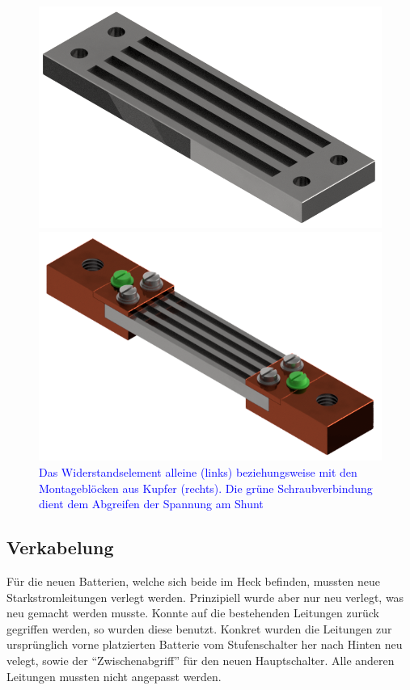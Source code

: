 \begin{figure}[h!]
\begin{minipage}{0.49\textwidth}
\includegraphics[width=\textwidth]{images/Shunt.png}
\end{minipage}\begin{minipage}{0.49\textwidth}
\includegraphics[width=\textwidth]{images/Shunt_komplett.png}
\end{minipage}
\caption{\textcolor{blue}{Das Widerstandselement alleine (links) beziehungsweise mit den Montageblöcken aus Kupfer (rechts). Die grüne Schraubverbindung dient dem Abgreifen der Spannung am Shunt}}%
\label{fig:shunt}%
\end{figure}

\subsection{Verkabelung}
Für die neuen Batterien, welche sich beide im Heck befinden, mussten neue Starkstromleitungen verlegt werden. Prinzipiell wurde aber nur neu verlegt, was neu gemacht werden musste. Konnte auf die bestehenden Leitungen zurück gegriffen werden, so wurden diese benutzt. Konkret wurden die Leitungen zur ursprünglich vorne platzierten Batterie vom Stufenschalter her nach Hinten neu velegt, sowie der "`Zwischenabgriff"' für den neuen Hauptschalter. Alle anderen Leitungen mussten nicht angepasst werden.

